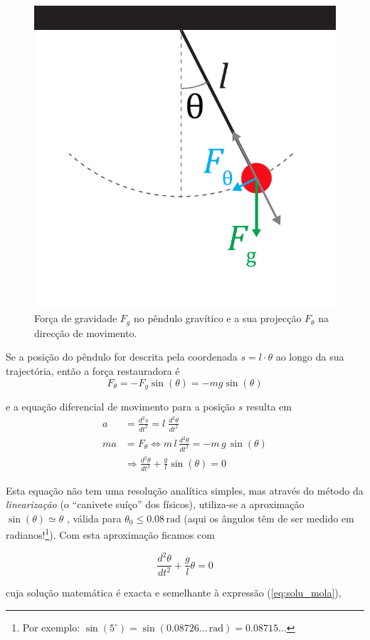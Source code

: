 \documentclass[a4paper,twoside,12pt]{article}      %
\begin{document}
\begin{figure}
	[!htbp] \centering 
	\includegraphics[width=0.4	\textwidth]{Fig-2}
	\caption{Força de gravidade $F_g$ no pêndulo gravítico e a sua projecção $F_{\theta}$ na direcção de movimento. \label{fig:3} } 
\end{figure}

Se a posição do pêndulo for descrita pela coordenada $s= l\cdot \theta$ ao longo da sua trajectória, 
então a força restauradora é 
\begin{equation}
	\label{eq:4} 
F_{\theta} = - F_{g} \sin(\theta) = - mg \sin(\theta)
\end{equation}

e a equação diferencial de movimento para a posição $s$ resulta em
\begin{align}
	\label{eq:5} 
	a &= \frac{d^2 s}{dt^2} =  l\;  \frac{d^2 \theta}{dt^2} \nonumber \\
	ma &= F_{\theta}\Leftrightarrow m \, l \, \frac{d^2 \theta}{dt^2} = - m \,  g \, \sin(\theta) \nonumber \\
	 & \Rightarrow \frac{d^2 \theta}{dt^2} + \frac{g}{l} \sin(\theta) = 0
\end{align}

Esta equação não tem uma resolução analítica simples, mas através do método  da \emph{linearização} (o ``canivete suíço'' dos físicos),  utiliza-se a aproximação $ \sin(\theta) \simeq \theta$ , válida para  $\theta_0 \le 0.08\,\mathrm{rad}$ (aqui  os ângulos têm de ser medido em radianos!\footnote{ Por exemplo: $\sin(5 ^{\circ}) = \sin(0.08726... \, \mathrm{rad}) = 0.08715... $}).
Com esta aproximação ficamos com 

\begin{equation}
	\label{eq:6} 
	 \frac{d^2 \theta}{dt^2} + \frac{g}{l} \theta =0
\end{equation}

cuja solução matemática é exacta e semelhante à expressão (\ref{eq:solu_mola}),
\end{document}
